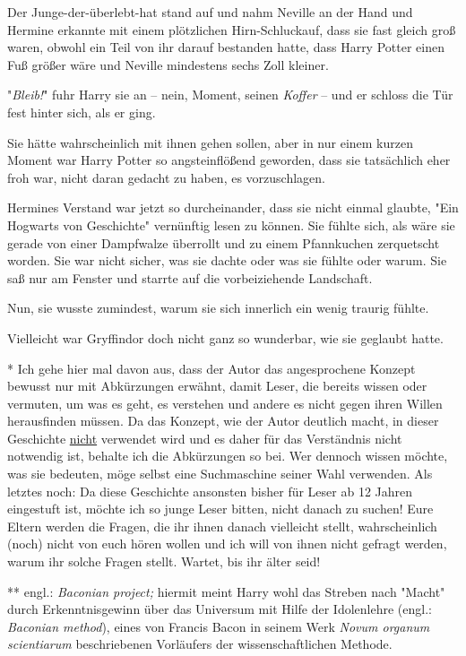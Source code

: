 {Der Junge-der-überlebt-hat stand auf und nahm Neville an der Hand und Hermine erkannte mit einem plötzlichen Hirn-Schluckauf, dass sie fast gleich groß waren, obwohl ein Teil von ihr darauf bestanden hatte, dass Harry Potter einen Fuß größer wäre und Neville mindestens sechs Zoll kleiner.

"\emph{Bleib!}" fuhr Harry sie an -- nein, Moment, seinen \emph{Koffer} -- und er schloss die Tür fest hinter sich, als er ging.

Sie hätte wahrscheinlich mit ihnen gehen sollen, aber in nur einem kurzen Moment war Harry Potter so angsteinflößend geworden, dass sie tatsächlich eher froh war, nicht daran gedacht zu haben, es vorzuschlagen.

Hermines Verstand war jetzt so durcheinander, dass sie nicht einmal glaubte, "Ein Hogwarts von Geschichte" vernünftig lesen zu können. Sie fühlte sich, als wäre sie gerade von einer Dampfwalze überrollt und zu einem Pfannkuchen zerquetscht worden. Sie war nicht sicher, was sie dachte oder was sie fühlte oder warum. Sie saß nur am Fenster und starrte auf die vorbeiziehende Landschaft.

Nun, sie wusste zumindest, warum sie sich innerlich ein wenig traurig fühlte.

Vielleicht war Gryffindor doch nicht ganz so wunderbar, wie sie geglaubt hatte.

* Ich gehe hier mal davon aus, dass der Autor das angesprochene Konzept bewusst nur mit Abkürzungen erwähnt, damit Leser, die bereits wissen oder vermuten, um was es geht, es verstehen und andere es nicht gegen ihren Willen herausfinden müssen. Da das Konzept, wie der Autor deutlich macht, in dieser Geschichte \uline{nicht} verwendet wird und es daher für das Verständnis nicht notwendig ist, behalte ich die Abkürzungen so bei. Wer dennoch wissen möchte, was sie bedeuten, möge selbst eine Suchmaschine seiner Wahl verwenden. Als letztes noch: Da diese Geschichte ansonsten bisher für Leser ab 12 Jahren eingestuft ist, möchte ich so junge Leser bitten, nicht danach zu suchen! Eure Eltern werden die Fragen, die ihr ihnen danach vielleicht stellt, wahrscheinlich (noch) nicht von euch hören wollen und ich will von ihnen nicht gefragt werden, warum ihr solche Fragen stellt. Wartet, bis ihr älter seid!

** engl.: \emph{Baconian project;} hiermit meint Harry wohl das Streben nach "Macht" durch Erkenntnisgewinn über das Universum mit Hilfe der Idolenlehre (engl.: \emph{Baconian method}), eines von Francis Bacon in seinem Werk \emph{Novum organum scientiarum} beschriebenen Vorläufers der wissenschaftlichen Methode.

}
